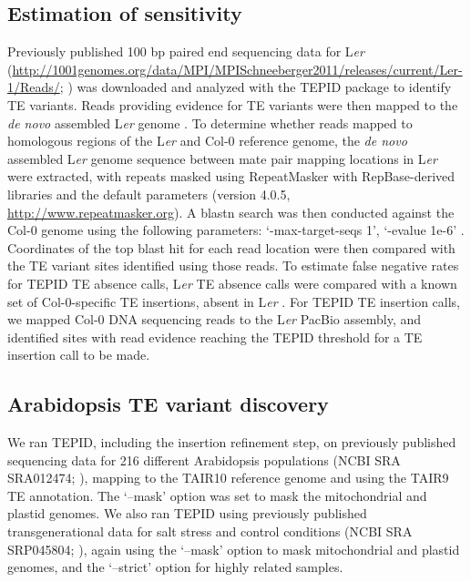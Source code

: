 \documentclass[12pt]{article}
\begin{document}
\subsection{Estimation of sensitivity}

Previously published 100 bp paired end sequencing data for L\emph{er}
(\url{http://1001genomes.org/data/MPI/MPISchneeberger2011/releases/current/Ler-1/Reads/};
\cite{Schneeberger:2011ft}) was downloaded and analyzed with the TEPID
package to identify TE variants. Reads providing evidence for TE
variants were then mapped to the \emph{de novo} assembled L\emph{er
}genome \cite{Chin:2013iw}. To determine whether reads mapped to
homologous regions of the L\emph{er} and Col-0 reference genome, the
\emph{de novo }assembled L\emph{er }genome sequence between mate pair
mapping locations in L\emph{er} were extracted, with repeats masked
using RepeatMasker with RepBase-derived libraries and the default
parameters (version 4.0.5, \url{http://www.repeatmasker.org}). A blastn
search was then conducted against the Col-0 genome using the following
parameters: `-max-target-seqs 1', `-evalue 1e-6' \cite{Camacho:2009fc}.
Coordinates of the top blast hit for each read location were then
compared with the TE variant sites identified using those reads. To
estimate false negative rates for TEPID TE absence calls, L\emph{er} TE
absence calls were compared with a known set of Col-0-specific TE
insertions, absent in L\emph{er }\cite{Quadrana:2016bi}. For TEPID TE
insertion calls, we mapped Col-0 DNA sequencing reads
\cite{Jiang:2014ih} to the L\emph{er }PacBio assembly, and identified
sites with read evidence reaching the TEPID threshold for a TE insertion
call to be made.

\subsection{Arabidopsis TE variant discovery}

We ran TEPID, including the insertion refinement step, on previously
published sequencing data for 216 different Arabidopsis populations
(NCBI SRA SRA012474; \cite{Schmitz:2013iu}), mapping to the TAIR10
reference genome and using the TAIR9 TE annotation. The `--mask' option
was set to mask the mitochondrial and plastid genomes. We also ran TEPID
using previously published transgenerational data for salt stress and
control conditions (NCBI SRA SRP045804; \cite{Jiang:2014ih}), again
using the `--mask' option to mask mitochondrial and plastid genomes, and
the `--strict' option for highly related samples.
\end{document}
